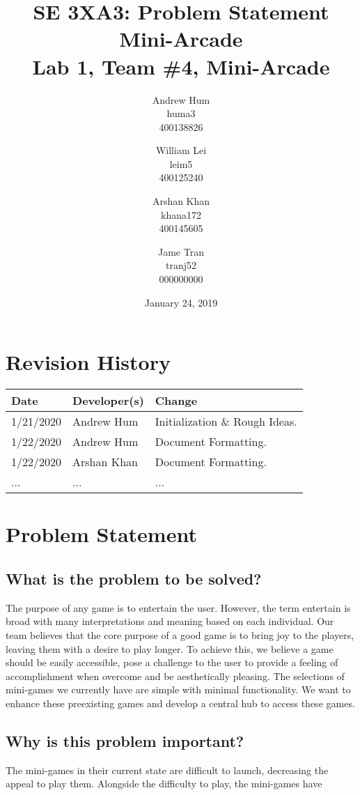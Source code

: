 \documentclass{article}
\title{SE 3XA3: Problem Statement \\ Mini-Arcade \\{\large Lab 1, Team \#4, Mini-Arcade}}
\author{Andrew Hum \\ huma3 \\ 400138826 \and
		William Lei \\ leim5 \\ 400125240 \and
		Arshan Khan \\ khana172 \\ 400145605 \and
		Jame Tran \\ tranj52 \\ 000000000
}
\date{January 24, 2019}
\begin{document}
\maketitle
\newpage

\tableofcontents
\newpage



\begin{table}[hp]
\section{Revision History} \label{TblRevisionHistory}
\begin{tabularx}{\textwidth}{llX}
\hline
\textbf{Date} & \textbf{Developer(s)} & \textbf{Change}\\
\hline
1/21/2020 & Andrew Hum & Initialization \& Rough Ideas.\\
\hline
1/22/2020 & Andrew Hum  & Document Formatting.\\
\hline
1/22/2020 & Arshan Khan & Document Formatting.\\
\hline
... & ... & ...\\
\hline
\end{tabularx}
\end{table}

\newpage

\section{Problem Statement}
\subsection{What is the problem to be solved?}
The purpose of any game is to entertain the user. However, the term entertain is broad with many interpretations and meaning based on each individual. Our team believes that the core purpose of a good game is to bring joy to the players, leaving them with a desire to play longer. To achieve this, we believe a game should be easily accessible, pose a challenge to the user to provide a feeling of accomplishment when overcome and be aesthetically pleasing. The selections of mini-games we currently have are simple with minimal functionality. We want to enhance these preexisting games and develop a central hub to access these games.

\subsection{Why is this problem important?}
The mini-games in their current state are difficult to launch, decreasing the appeal to play them. Alongside the difficulty to play, the mini-games have 
\end{document}
